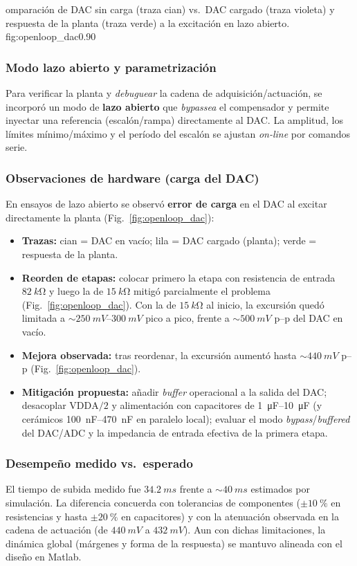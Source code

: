 {omparación de DAC sin carga (traza cian) vs.\ DAC cargado (traza violeta) y respuesta de la planta (traza verde) a la excitación en lazo abierto.}
{fig:openloop_dac}{0.90}

\subsubsection{Modo lazo abierto y parametrización}
Para verificar la planta y \emph{debuguear} la cadena de adquisición/actuación, se incorporó un modo de \textbf{lazo abierto} que \emph{bypassea} el compensador y permite inyectar una referencia (escalón/rampa) directamente al DAC. La amplitud, los límites mínimo/máximo y el período del escalón se ajustan \emph{on-line} por comandos serie.

\subsubsection{Observaciones de hardware (carga del DAC)}
En ensayos de lazo abierto se observó \textbf{error de carga} en el DAC al excitar directamente la planta (Fig.~\ref{fig:openloop_dac}):
\begin{itemize}
	\item \textbf{Trazas:} cian = DAC en vacío; lila = DAC cargado (planta); verde = respuesta de la planta.
	\item \textbf{Reorden de etapas:} colocar primero la etapa con resistencia de entrada \(\SI{82}{k\ohm}\) y luego la de \(\SI{15}{k\ohm}\) mitigó parcialmente el problema (Fig.~\ref{fig:openloop_dac}). Con la de \(\SI{15}{k\ohm}\) al inicio, la excursión quedó limitada a \(\sim\SI{250}{mV}\)–\(\SI{300}{mV}\) pico a pico, frente a \(\sim\SI{500}{mV}\) p–p del DAC en vacío.
	\item \textbf{Mejora observada:} tras reordenar, la excursión aumentó hasta \(\sim\SI{440}{mV}\) p–p (Fig.~\ref{fig:openloop_dac}).
	\item \textbf{Mitigación propuesta:} añadir \emph{buffer} operacional a la salida del DAC; desacoplar \(\mathrm{VDDA}/2\) y alimentación con capacitores de \SIrange{1}{10}{\micro\farad} (y cerámicos \SIrange{100}{470}{nF} en paralelo local); evaluar el modo \emph{bypass}/\emph{buffered} del DAC/ADC y la impedancia de entrada efectiva de la primera etapa.
\end{itemize}


\subsubsection{Desempeño medido vs.\ esperado}
El tiempo de subida medido fue \(\SI{34.2}{ms}\) frente a \(\sim\SI{40}{ms}\) estimados por simulación. La diferencia concuerda con tolerancias de componentes (\(\pm\SI{10}{\percent}\) en resistencias y hasta \(\pm\SI{20}{\percent}\) en capacitores) y con la atenuación observada en la cadena de actuación (de \(\SI{440}{mV}\) a \(\SI{432}{mV}\)). Aun con dichas limitaciones, la dinámica global (márgenes y forma de la respuesta) se mantuvo alineada con el diseño en Matlab.

